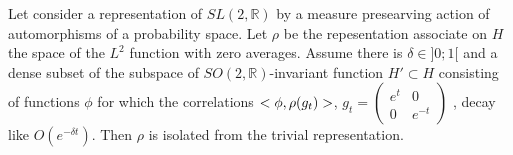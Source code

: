 \begin{prop}
Let consider a representation of $SL(2,\mathbb{R})$ by a measure presearving action of automorphisms of a probability space. Let $\rho$ be the repesentation associate on $H$ the space of the $L^2$ function with zero averages. Assume there is $\delta \in ]0;1[$ and a dense subset of the subspace of $SO(2,\mathbb{R})$-invariant function $H' \subset H$ consisting of functions $\phi$ for which the correlations $<\phi, \rho(g_t) \time \phi>$, $g_t=\begin{pmatrix} e^t & 0 \\ 0 & e^{-t} \end{pmatrix} $
, decay like $O(e^{- \delta t})$. Then $\rho$ is isolated from the trivial representation.
\cite{2005math.....11614A}
\end{prop}
